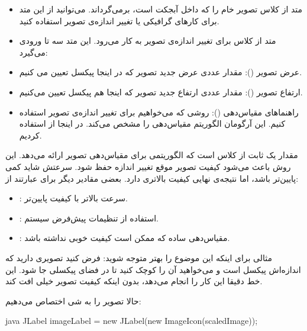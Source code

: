 \begin{itemize}
\tightlist
\item
  متد  از کلاس  تصویر خام
   را که داخل آبجکت  است، برمی‌گرداند.
  می‌توانید از این متد برای کارهای گرافیکی یا تغییر اندازه‌ی تصویر استفاده
  کنید.
\item
  متد  از کلاس  برای
  تغییر اندازه‌ی تصویر به کار می‌رود. این متد سه تا ورودی می‌گیرد:
\item
  عرض تصویر (): مقدار عددی عرض جدید تصویر که در اینجا
   پیکسل تعیین می کنیم.
\item
  ارتفاع تصویر (): مقدار عددی ارتفاع جدید تصویر که
  اینجا هم  پیکسل تعیین می‌کنیم.
\item
  راهنماهای مقیاس‌دهی (): روشی که می‌خواهیم برای تغییر
  اندازه‌ی تصویر استفاده کنیم. این آرگومان الگوریتم مقیاس‌دهی را مشخص
  می‌کند. در اینجا از  استفاده کردیم.
\end{itemize}

مقدار  یک ثابت از کلاس
 است که الگوریتمی برای مقیاس‌دهی تصویر ارائه می‌دهد.
این روش باعث می‌شود کیفیت تصویر موقع تغییر اندازه حفظ شود. سرعتش شاید کمی
پایین‌تر باشد، اما نتیجه‌ی نهایی کیفیت بالاتری دارد. بعضی مقادیر دیگر برای
 عبارتند از:

\begin{itemize}
\tightlist
\item
   : سرعت بالاتر با کیفیت پایین‌تر.
\item
   : استفاده از تنظیمات پیش‌فرض سیستم.
\item
   : مقیاس‌دهی ساده که ممکن است کیفیت
  خوبی نداشته باشد.
\end{itemize}

مثالی برای اینکه این موضوع را بهتر متوجه شوید: فرض کنید تصویری دارید که
اندازه‌اش  پیکسل است و می‌خواهید آن را کوچک کنید تا
در فضای  پیکسلی جا شود. این خط دقیقا این کار را
انجام می‌دهد، بدون اینکه کیفیت تصویر خیلی افت کند.

حالا تصویر را به شی  اختصاص می‌دهیم:

\begin{codebox}{java}
JLabel imageLabel = new JLabel(new ImageIcon(scaledImage));
\end{codebox}

